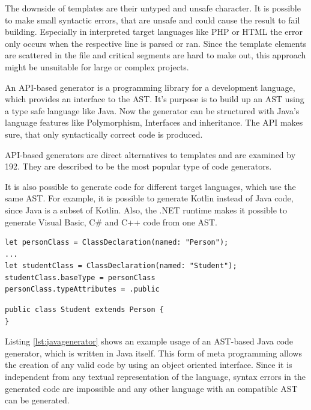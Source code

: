 The downside of templates are their untyped and unsafe character.
It is possible to make small syntactic errors, that are unsafe and could cause the result to fail building.
Especially in interpreted target languages like \ac{PHP} or \ac{HTML} the error only occurs when the respective line is parsed or ran.
Since the template elements are scattered in the file and critical segments are hard to make out, this approach might be unsuitable for large or complex projects.

An \ac{API}-based generator is a programming library for a development language, which provides an interface to the \ac{AST}.
It's purpose is to build up an \ac{AST} using a type safe language like Java.
Now the generator can be structured with Java's language features like Polymorphism, Interfaces and inheritance.
The \ac{API} makes sure, that only syntactically correct code is produced.

\ac{API}-based generators are direct alternatives to templates and are examined by \cite{stahl_model-driven_2006} 192.
They are described to be the most popular type of code generators.

It is also possible to generate code for different target languages, which use the same \ac{AST}.
For example, it is possible to generate Kotlin instead of Java code, since Java is a subset of Kotlin.
Also, the .NET runtime makes it possible to generate Visual Basic, C\# and C++ code from one \ac{AST}.

\begin{lstlisting}[caption={Using an \ac{API} to generate Java code, written in Swift}, style=swift, label=lst:javagenerator]
let personClass = ClassDeclaration(named: "Person");
...
let studentClass = ClassDeclaration(named: "Student");
studentClass.baseType = personClass
personClass.typeAttributes = .public
\end{lstlisting}

\begin{lstlisting}[caption={Java code result of lising \ref{lst:javagenerator}}, style=myjava, label=lst:generatredjava]
public class Student extends Person {
}
\end{lstlisting}

Listing \ref{lst:javagenerator} shows an example usage of an \ac{AST}-based Java code generator, which is written in Java itself.
This form of meta programming allows the creation of any valid code by using an object oriented interface.
Since it is independent from any textual representation of the language, syntax errors in the generated code are impossible and any other language with an compatible \ac{AST} can be generated.

